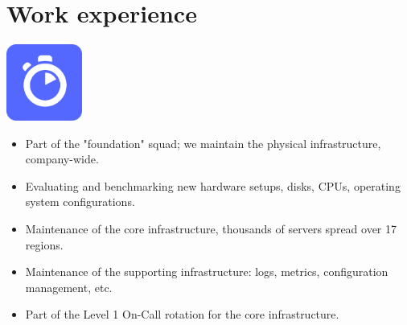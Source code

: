 \section{Work experience} 
\noindent
\begin{minipage}{.15\textwidth}
    \centerline{\includegraphics[width=25mm]{img/algolia}}
\end{minipage}%
\hspace{5mm}
\begin{minipage}{.8\textwidth}
    \raggedright
    \begin{itemize}
	\item Part of the "foundation" squad; we maintain the physical infrastructure, company-wide.
	\item Evaluating and benchmarking new hardware setups, disks, CPUs, operating system configurations.
	\item Maintenance of the core infrastructure, thousands of servers spread over 17 regions.
	\item Maintenance of the supporting infrastructure: logs, metrics, configuration management, etc.
	\item Part of the Level 1 On-Call rotation for the core infrastructure.
    \end{itemize}
\end{minipage}

